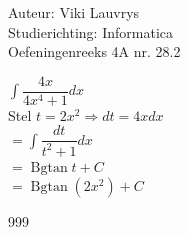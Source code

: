 \documentclass[a4paper]{article}
\begin{document}
  
\noindent \large Auteur: Viki	Lauvrys \\
\noindent \large Studierichting: Informatica\\
\noindent \large Oefeningenreeks 4A nr. 28.2\\

\medskip

\normalsize

$ \displaystyle\int \dfrac{4x}{4x^4 +1} dx $ \\

Stel $ t = 2x^2 \Rightarrow dt = 4x dx$ \\

$ = \displaystyle\int \dfrac{dt}{t^2 +1} dx $ \\

$ = \operatorname{Bgtan} t + C $ \\

$ = \operatorname{Bgtan}(2x^2) + C $ \\


\begin{thebibliography}{999}
\end{thebibliography}
\end{document}

